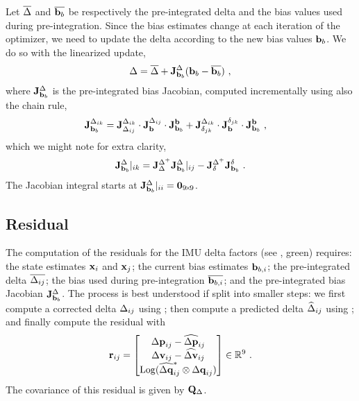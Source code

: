 Let $\overline{\Delta}$ and $\overline{{\bf b}_b}$ be respectively the pre-integrated delta and the bias values used during pre-integration. Since the bias estimates change at each iteration of the optimizer, we need to update the delta according to the new bias values ${\bf b}_b$. We do so with the linearized update,
%
\begin{align}\label{equ:delta_correction}
\Delta = \overline{\Delta} + {{\bf J}^{\Delta}_{{\bf b}_b}}({\bf b}_b - \overline{{\bf b}_b})
~,
\end{align}
%
where ${{\bf J}^{\Delta}_{{\bf b}_b}}$ is the pre-integrated bias Jacobian, computed incrementally using also the chain rule,
%
\begin{align*}
{{\bf J}^{\Delta_{ik}}_{{\bf b}_b}} 
&= 
{{\bf J}^{\Delta_{ik}}_{\Delta_{ij}}} \cdot {{\bf J}^{\Delta_{ij}}_{{\bf b}}} \cdot {{\bf J}^{{\bf b}}_{{\bf b}_b}} 
+ 
{{\bf J}^{\Delta_{ik}}_{\delta_{jk}}} \cdot {{\bf J}^{\delta_{jk}}_{{\bf b}}} \cdot {{\bf J}^{{\bf b}}_{{\bf b}_b}} 
~,
\end{align*}
%
which we might note for extra clarity,
%
\begin{align}
{{\bf J}^{\Delta}_{{\bf b}_b}}|_{ik} = {{\bf J}^{\Delta^+}_{\Delta}}{{\bf J}^{\Delta}_{{\bf b}_b}}|_{ij} - {{\bf J}^{\Delta^+}_{\delta}}{{\bf J}^{\delta}_{{\bf b}_b}}
~.
\end{align}
%
The Jacobian integral starts at ${{\bf J}^{\Delta}_{{\bf b}_b}}|_{ii} = {\bf0}_{9\!\times\! 9}$.


\subsection{Residual}

The computation of the residuals for the IMU delta factors (see , green) requires: the state estimates ${\bf x}_i$ and ${\bf x}_j$; the current bias estimates ${\bf b}_{b,i}$; the pre-integrated delta $\overline{\Delta_{ij}}$; the bias used during pre-integration $\overline{{\bf b}_{b,i}}$; and the pre-integrated bias Jacobian ${{\bf J}^{\Delta}_{{\bf b}_b}}$. The process is best understood if split into smaller steps: we first compute a corrected delta $\Delta_{ij}$ using ; then compute a predicted delta $\widehat{\Delta}_{ij}$ using ; and finally compute the residual with
%
\begin{align}
{\bf r}_{ij} 
= \begin{bmatrix}
{\Delta{\bf p}}_{ij}-\widehat{{\Delta{\bf p}}}_{ij} \\
{\Delta{\bf v}}_{ij}-\widehat{{\Delta{\bf v}}}_{ij} \\
\operatorname*{Log}(\widehat{{\Delta{\bf q}}}_{ij}^*\otimes{\Delta{\bf q}}_{ij})
\end{bmatrix} 
\in {\mathbb R}^9
~.
\end{align}
%
The covariance of this residual is given by ${\bf Q}_\Delta$.







